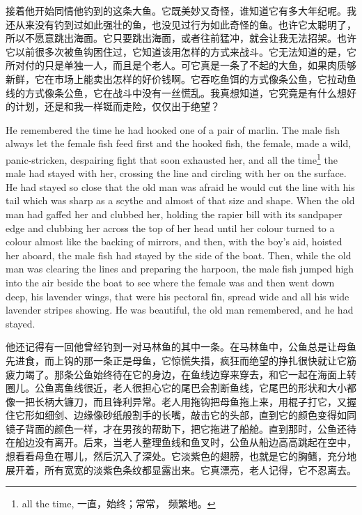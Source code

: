 \begin{paracol}{2}
\switchcolumn

接着他开始同情他钓到的这条大鱼。它既美妙又奇怪，谁知道它有多大年纪呢。我还从来没有钓到过如此强壮的鱼，也没见过行为如此奇怪的鱼。也许它太聪明了，所以不愿意跳出海面。它只要跳出海面，或者往前猛冲，就会让我无法招架。也许它以前很多次被鱼钩困住过，它知道该用怎样的方式来战斗。它无法知道的是，它所对付的只是单独一人，而且是个老人。可它真是一条了不起的大鱼，如果肉质够新鲜，它在市场上能卖出怎样的好价钱啊。它吞吃鱼饵的方式像条公鱼，它拉动鱼线的方式像条公鱼，它在战斗中没有一丝慌乱。我真想知道，它究竟是有什么想好的计划，还是和我一样铤而走险，仅仅出于绝望？

\switchcolumn*

He remembered the time he had hooked one of a pair of marlin. The male fish
always let the female fish feed first and the hooked fish, the female, made
a wild, panic-\gls{stricken}, \gls{despairing} fight that soon
\gls{exhausted} her, and all the time\footnote{all the time, 一直，始终；常常，
  频繁地。} the male had stayed with her, crossing the line and circling
with her on the surface. He had stayed so close that the old man was afraid
he would cut the line with his tail which was sharp as a \gls{scythe} and
almost of that size and shape. When the old man had gaffed her and clubbed
her, holding the \gls{rapier} \gls{bill} with its \gls{sandpaper} edge and
clubbing her across the top of her head until her colour turned to a colour
almost like the backing of mirrors, and then, with the boy's aid, hoisted
her aboard, the male fish had stayed by the side of the boat. Then, while
the old man was clearing the lines and preparing the harpoon, the male fish
jumped high into the air beside the boat to see where the female was and
then went down deep, his \gls{lavender} wings, that were his \gls{pectoral} fin, spread wide and all his wide lavender \glspl{stripe} showing. He was
beautiful, the old man remembered, and he had stayed.

\switchcolumn

他还记得有一回他曾经钓到一对马林鱼的其中一条。在马林鱼中，公鱼总是让母鱼先进食，而上钩的那一条正是母鱼，它惊慌失措，疯狂而绝望的挣扎很快就让它筋疲力竭了。那条公鱼始终待在它的身边，在鱼线边穿来穿去，和它一起在海面上转圈儿。公鱼离鱼线很近，老人很担心它的尾巴会割断鱼线，它尾巴的形状和大小都像一把长柄大镰刀，而且锋利异常。老人用拖钩把母鱼拖上来，用棍子打它，又握住它形如细剑、边缘像砂纸般割手的长嘴，敲击它的头部，直到它的颜色变得如同镜子背面的颜色一样，才在男孩的帮助下，把它拖进了船舱。直到那时，公鱼还待在船边没有离开。后来，当老人整理鱼线和鱼叉时，公鱼从船边高高跳起在空中，想看看母鱼在哪儿，然后沉入了深处。它淡紫色的翅膀，也就是它的胸鳍，充分地展开着，所有宽宽的淡紫色条纹都显露出来。它真漂亮，老人记得，它不忍离去。


\end{paracol}
